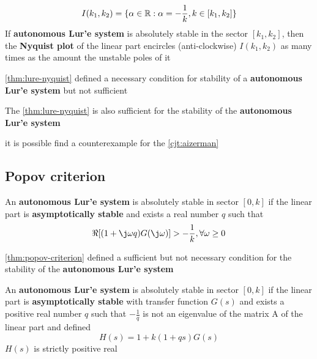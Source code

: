 \begin{theorem}\label{thm:lure-nyquist}
    \[
        I(k_1,k_2) = \{\alpha \in \mathbb{R} : \alpha = -\frac{1}{k}, k \in [k_1,k_2]\}
    \]
    If \textbf{autonomous Lur'e system} is absolutely stable in the sector $[k_1,k_2]$, then the \textbf{Nyquist plot} of the linear part encircles (anti-clockwise) $I(k_1,k_2)$ as many times as the amount the unstable poles of it
\end{theorem}

\begin{nb}\cref{thm:lure-nyquist} defined a necessary condition for stability of a \textbf{autonomous Lur'e system} but not sufficient\end{nb}

\begin{conjecture}\label{cjt:aizerman}
    The \cref{thm:lure-nyquist} is also sufficient for the stability of the \textbf{autonomous Lur'e system}
\end{conjecture}

\begin{nb}
    it is possible find a counterexample for the \cref{cjt:aizerman}
\end{nb}

\subsection{Popov criterion}

\begin{theorem}\label{thm:popov-criterion}
    An \textbf{autonomous Lur'e system} is absolutely stable in sector $[0,k]$ if the linear part is \textbf{asymptotically stable} and exists a real number $q$ such that
    \[
        \Re [(1+\j \omega q) G(\j \omega)] > - \frac{1}{k}, \forall \omega \geq 0
    \]
\end{theorem}

\begin{nb}\cref{thm:popov-criterion} defined a sufficient but not necessary condition for the stability of the \textbf{autonomous Lur'e system}\end{nb}

\begin{theorem}
    An \textbf{autonomous Lur'e system} is absolutely stable in sector $[0,k]$ if the linear part is \textbf{asymptotically stable} with transfer function $G(s)$ and exists a positive real number $q$ such that $-\frac{1}{q}$ is not an eigenvalue of the matrix A of the linear part and defined
    \[
        H(s) = 1+k(1+qs)G(s)
    \]
    $H(s)$ is strictly positive real
\end{theorem}


